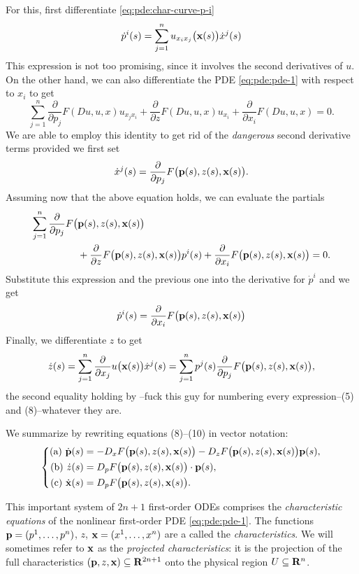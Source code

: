 For this, first differentiate \eqref{eq:pde:char-curve-p-i}
\[
  \dot{p}^i(s)=\sum_{j=1}^n u_{x_ix_j}\bigl(\mathbf{x}(s)\bigr)\dot{x}^j(s)
\]
This expression is not too promising, since it involves the second
derivatives of \(u\). On the other hand, we can also differentiate the PDE
\eqref{eq:pde:pde-1} with respect to \(x_i\) to get
\[
  \sum_{j=1}^n
  \frac{\partial}{\partial p_j}F(Du,u,x)u_{x_jx_i}
  +\frac{\partial}{\partial z}F(Du,u,x)u_{x_i}
  +\frac{\partial}{\partial x_i}F(Du,u,x)=0.
\]
We are able to employ this identity to get rid of the \emph{dangerous}
second derivative terms provided we first set
\[
  \dot{x}^j(s)=\frac{\partial}{\partial
    p_j}F\bigl(\mathbf{p}(s),z(s),\mathbf{x}(s)\bigr).
\]
Assuming now that the above equation holds, we can evaluate the partials
\[
  \begin{aligned}
    \sum_{j=1}^n\frac{\partial}{\partial
      p_j}F\bigl(&\mathbf{p}(s),z(s),\mathbf{x}(s)\bigr)\\
    &+\frac{\partial}{\partial z}F\bigl(\mathbf{p}(s),z(s),\mathbf{x}(s)\bigr)p^{i}(s)
    +\frac{\partial}{\partial x_i}F\bigl(\mathbf{p}(s),z(s),\mathbf{x}(s)\bigr)=0.
  \end{aligned}
\]
Substitute this expression and the previous one into the derivative for
\(\dot{p}^i\) and we get
\[
  \begin{aligned}
    \dot{p}^i(s)=\frac{\partial}{\partial x_i}F\bigl(\mathbf{p}(s),z(s),\mathbf{x}(s)\bigr)
  \end{aligned}
\]
Finally, we differentiate \(z\) to get
\[
  \dot z(s)=
  \sum_{j=1}^n\frac{\partial}{\partial x_j}u\bigl(\mathbf{x}(s)\bigr)
  \dot{x}^j(s)=
  \sum_{j=1}^n p^j(s)\frac{\partial}{\partial
    p_j}F\bigl(\mathbf{p}(s),z(s),\mathbf{x}(s)\bigr),
\]
the second equality holding by --fuck this guy for numbering every
expression--(5) and (8)--whatever they are.

We summarize by rewriting equations (8)--(10) in vector notation:
\begin{equation}
  \label{eq:pde:characteristics}
  \left\{
    \begin{aligned}
      \text{(a) }\dot{\mathbf{p}}(s)&=-D_xF\bigl(\mathbf{p}(s),z(s),\mathbf{x}(s)\bigr)
      -D_zF\bigl(\mathbf{p}(s),z(s),\mathbf{x}(s)\bigr)\mathbf{p}(s),\\
      \text{(b) }\dot z(s)&=D_pF\bigl(\mathbf{p}(s),z(s),\mathbf{x}(s)\bigr)\cdot\mathbf{p}(s),\\
      \text{(c) }\dot{\mathbf{x}}(s)&=D_pF\bigl(\mathbf{p}(s),z(s),\mathbf{x}(s)\bigr).
    \end{aligned}
  \right.
\end{equation}

This important system of \(2n+1\) first-order ODEs comprises the
\emph{characteristic equations} of the nonlinear first-order PDE
\eqref{eq:pde:pde-1}. The functions \(\mathbf{p}=(p^1,\dotsc,p^n)\), \(z\),
\(\mathbf{x}=(x^1,\dotsc,x^n)\) are a called the \emph{characteristics}. We will
sometimes refer to \(\mathbf{x}\) as the \emph{projected characteristics}: it is
the projection of the full characteristics
\((\mathbf{p},z,\mathbf{x})\subseteq\mathbf{R}^{2n+1}\) onto the physical region
\(U\subseteq\mathbf{R}^n\).

